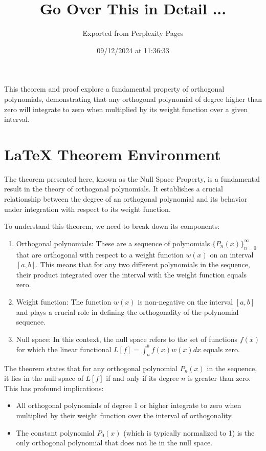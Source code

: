 \documentclass{article}
\title{Go Over This in Detail ...}
\author{Exported from Perplexity Pages}
\date{09/12/2024 at 11:36:33}
\begin{document}
\maketitle

This theorem and proof explore a fundamental property of orthogonal polynomials, demonstrating that any orthogonal polynomial of degree higher than zero will integrate to zero when multiplied by its weight function over a given interval.

\section{LaTeX Theorem Environment}
The theorem presented here, known as the Null Space Property, is a fundamental result in the theory of orthogonal polynomials. It establishes a crucial relationship between the degree of an orthogonal polynomial and its behavior under integration with respect to its weight function.

To understand this theorem, we need to break down its components:

\begin{enumerate}
\item Orthogonal polynomials: These are a sequence of polynomials $\{P_n(x)\}_{n=0}^{\infty}$ that are orthogonal with respect to a weight function $w(x)$ on an interval $[a,b]$. This means that for any two different polynomials in the sequence, their product integrated over the interval with the weight function equals zero.
\item Weight function: The function $w(x)$ is non-negative on the interval $[a,b]$ and plays a crucial role in defining the orthogonality of the polynomial sequence.
\item Null space: In this context, the null space refers to the set of functions $f(x)$ for which the linear functional $L[f]=\int_a^bf(x)w(x)dx$ equals zero.
\end{enumerate}

The theorem states that for any orthogonal polynomial $P_n(x)$ in the sequence, it lies in the null space of $L[f]$ if and only if its degree $n$ is greater than zero. This has profound implications:

\begin{itemize}
\item All orthogonal polynomials of degree 1 or higher integrate to zero when multiplied by their weight function over the interval of orthogonality.
\item The constant polynomial $P_0(x)$ (which is typically normalized to 1) is the only orthogonal polynomial that does not lie in the null space.
\end{itemize}
\end{document}
